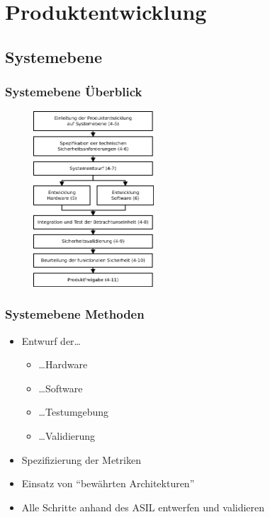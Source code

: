 \documentclass[]{beamer}
\begin{document}
\section{Produktentwicklung}
\label{sec:Produktentwicklung}

\subsection{Systemebene}
\begin{frame}
\frametitle{Systemebene Überblick}

\begin{figure}
   \includegraphics[width=4.5cm]{Abb_6_3}
\end{figure}

\end{frame}

\begin{frame}
\frametitle{Systemebene Methoden}

\begin{itemize}
    \item Entwurf der\dots
    \begin{itemize}
        \item \dots Hardware
        \item \dots Software
        \item \dots Testumgebung
        \item \dots Validierung
    \end{itemize}
    \item Spezifizierung der Metriken
    \item Einsatz von "`bewährten Architekturen"'
    \item Alle Schritte anhand des ASIL entwerfen und validieren
\end{itemize}

\end{frame}
\end{document}
